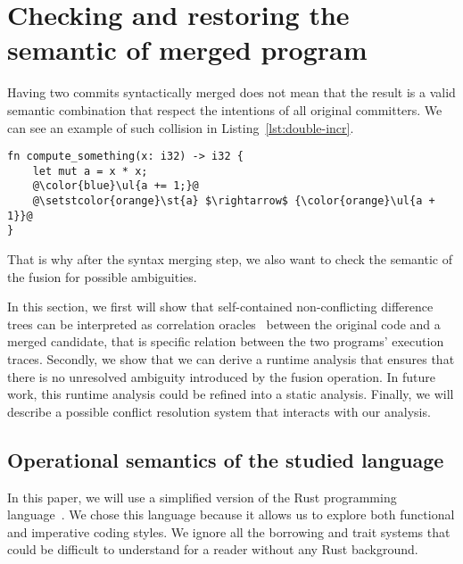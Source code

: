 \documentclass[a4paper,11pt]{article}
\newcommand\todo[1]{}%
\begin{document}
\todo{Grammar of this format if space is available. I doubt about this...}

\section{Checking and restoring the semantic of merged program}
\label{sec:semantic-merge}

Having two commits syntactically merged does not mean that the result
is a valid semantic combination that respect the intentions of all
original committers. We can see an example of such collision in Listing~\ref{lst:double-incr}.

\begin{lstlisting}[label=lst:double-incr, caption={Double fix of the same function by different commits. The syntactic fusion does not create a conflict but semantically we will most probably create a bug here.}]
fn compute_something(x: i32) -> i32 {
    let mut a = x * x;
    @\color{blue}\ul{a += 1;}@
    @\setstcolor{orange}\st{a} $\rightarrow$ {\color{orange}\ul{a + 1}}@
}
\end{lstlisting}

That is why after the syntax merging step, we also want to check the
semantic of the fusion for possible ambiguities.

In this section, we first will show that self-contained
non-conflicting difference trees can be interpreted as correlation
oracles~\cite{girka2017verifiable} between the original code and a merged candidate,
that is specific relation between the two programs' execution
traces. Secondly, we show that we can derive a runtime analysis that
ensures that there is no unresolved ambiguity introduced by the fusion
operation. In future work, this runtime analysis could be refined into
a static analysis. Finally, we will describe a possible conflict resolution system that interacts with our analysis.

\subsection{Operational semantics of the studied language}

In this paper, we will use a simplified version of the Rust
programming language~\cite{rust-lang}. We chose this language because it
allows us to explore both functional and imperative coding styles.  We ignore all the borrowing and trait systems that could be difficult to understand for a reader without any Rust background.
\end{document}

